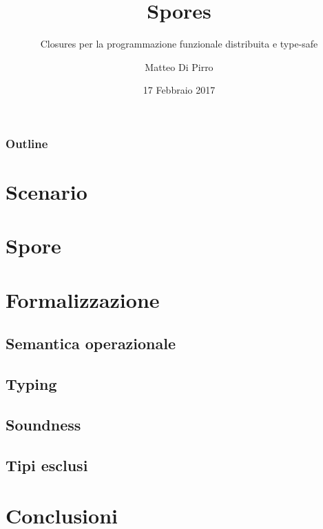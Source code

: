\documentclass{beamer}
\title{Spores}
\subtitle{\newline Closures per la programmazione funzionale distribuita e type-safe}
\author{Matteo Di Pirro}
\date{17 Febbraio 2017}
\institute{Università degli Studi di Padova}
\begin{document}
\newcommand{\turnOffNumbers}{true} %

\begin{frame}[noframenumbering]
\titlepage
\end{frame}

\let\turnOffNumbers\empty
\begin{frame}
	\frametitle{Outline}
	\tableofcontents
\end{frame}

\section{Scenario}




\section{Spore}




\section{Formalizzazione}
\subsection{Semantica operazionale}


\subsection{Typing}



\subsection{Soundness}


\subsection{Tipi esclusi}


\section{Conclusioni}



\appendix
\makethanks
\renewcommand{\turnOffNumbers}{true} %

\end{document}
